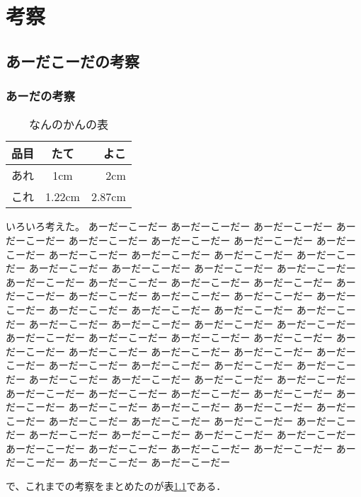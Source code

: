 \chapter{考察}\label{chap:discussion}

\section{あーだこーだの考察}\label{sec:disc1}

\subsection{あーだの考察}\label{subsec:disc2}

\begin{table}[th]
\begin{center}
\caption{なんのかんの表}
\label{tbl:hyou}
\vspace{4mm}
\begin{tabular}{l||c|r}
\hline
品目 & たて & よこ \\
\hline \hline
あれ & 1cm & 2cm \\
これ & 1.22cm & 2.87cm \\
\hline
\end{tabular}
\end{center}
\end{table}

いろいろ考えた。
あーだーこーだー あーだーこーだー あーだーこーだー あーだーこーだー
あーだーこーだー あーだーこーだー あーだーこーだー あーだーこーだー
あーだーこーだー あーだーこーだー あーだーこーだー あーだーこーだー
あーだーこーだー あーだーこーだー あーだーこーだー あーだーこーだー
あーだーこーだー あーだーこーだー あーだーこーだー あーだーこーだー
あーだーこーだー あーだーこーだー あーだーこーだー あーだーこーだー
あーだーこーだー あーだーこーだー あーだーこーだー あーだーこーだー
あーだーこーだー あーだーこーだー あーだーこーだー あーだーこーだー
あーだーこーだー あーだーこーだー あーだーこーだー あーだーこーだー
あーだーこーだー あーだーこーだー あーだーこーだー あーだーこーだー
あーだーこーだー あーだーこーだー あーだーこーだー あーだーこーだー
あーだーこーだー あーだーこーだー あーだーこーだー あーだーこーだー
あーだーこーだー あーだーこーだー あーだーこーだー あーだーこーだー
あーだーこーだー あーだーこーだー あーだーこーだー あーだーこーだー
あーだーこーだー あーだーこーだー あーだーこーだー あーだーこーだー
あーだーこーだー あーだーこーだー
あーだーこーだー あーだーこーだー あーだーこーだー あーだーこーだー
あーだーこーだー あーだーこーだー あーだーこーだー あーだーこーだー
あーだーこーだー あーだーこーだー あーだーこーだー あーだーこーだー

で、これまでの考察をまとめたのが表\ref{tbl:hyou}である．

\newpage

